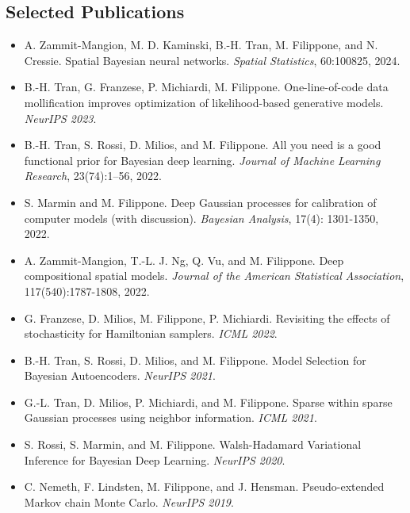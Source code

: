 \documentclass[oneside, a4paper, onecolumn, 10pt]{article}
\begin{document}
\subsection*{Selected Publications}

\linespread{0.9}
\selectfont

\begin{itemize}
  \setlength\itemsep{4pt}
\item  A. Zammit-Mangion, M. D. Kaminski, B.-H. Tran, M. Filippone, and N. Cressie. Spatial Bayesian neural networks. {\em Spatial Statistics}, 60:100825, 2024.
\item  B.-H. Tran, G. Franzese, P. Michiardi, M. Filippone. One-line-of-code data mollification improves optimization of likelihood-based generative models. {\em NeurIPS 2023}.
\item  B.-H. Tran, S. Rossi, D. Milios, and M. Filippone. All you need is a good functional prior for Bayesian deep learning. \emph{Journal of Machine Learning Research}, 23(74):1--56, 2022.
\item  S. Marmin and M. Filippone. Deep Gaussian processes for calibration of computer models (with discussion). \emph{Bayesian Analysis}, 17(4): 1301-1350, 2022.
\item  A. Zammit-Mangion, T.-L. J. Ng, Q. Vu, and M. Filippone. Deep compositional spatial models. \emph{Journal of the American Statistical Association}, 117(540):1787-1808, 2022.
\item  G. Franzese, D. Milios, M. Filippone, P. Michiardi. Revisiting the effects of stochasticity for Hamiltonian samplers. \emph{ICML 2022}.
\item  B.-H. Tran, S. Rossi, D. Milios, and M. Filippone. Model Selection for Bayesian Autoencoders. \emph{NeurIPS 2021}.  
\item  G.-L. Tran, D. Milios, P. Michiardi, and M. Filippone. Sparse within sparse Gaussian processes using neighbor information. \emph{ICML 2021}.
\item  S. Rossi, S. Marmin, and M. Filippone. Walsh-Hadamard Variational Inference for Bayesian Deep Learning. \emph{NeurIPS 2020}.  
\item  C. Nemeth, F. Lindsten, M. Filippone, and J. Hensman. Pseudo-extended Markov chain Monte Carlo. \emph{NeurIPS 2019}. 

\end{itemize}
\end{document}
